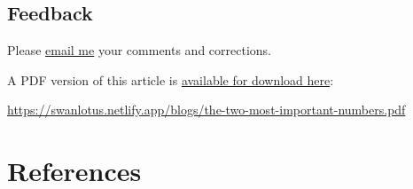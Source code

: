 \documentclass[
  a4paper,
]{article}
\begin{document}
\hypertarget{feedback}{%
\subsection{Feedback}\label{feedback}}

Please \href{mailto:feedback.swanlotus@gmail.com}{email me} your
comments and corrections.

\noindent A PDF version of this article is
\href{./the-two-most-important-numbers.pdf}{available for download
here}:

\begin{small}

\begin{sffamily}

\url{https://swanlotus.netlify.app/blogs/the-two-most-important-numbers.pdf}

\end{sffamily}

\end{small}

\hypertarget{bibliography}{%
\section*{References}\label{bibliography}}
\end{document}
